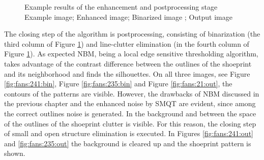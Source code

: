 \documentclass[draft,final]{vutinfth} %
\begin{document}
{\begin{figure}[H]

\caption{Example results of the enhancement and postprocessing stage
				 Example image;  Enhanced image;  Binarized image ;  Output image}
\label{fig:fans:enhance}

\end{figure}
}
\par
The closing step of the algorithm is postprocessing, consisting of binarization (the third column of Figure \ref{fig:fans:enhance}) and line-clutter elimination (in the fourth column of Figure \ref{fig:fans:enhance}).
As expected NBM, being a local edge sensitive thresholding algorithm, takes advantage of the contrast difference between the outlines of the shoeprint  and its neighborhood and finds the silhouettes. 
On all three images, see Figure \ref{fig:fans:241:bin}, Figure \ref{fig:fans:235:bin} and Figure \ref{fig:fans:21:out}, the contours of the patterns are visible.
However, the drawbacks of NBM discussed in the previous chapter and the enhanced noise by SMQT are evident, since among the correct outlines noise is generated.
In the background and between the space of the outlines of the shoeprint clutter is visible.
For this reason, the closing step of small and open structure elimination is executed.
In Figures \ref{fig:fans:241:out} and \ref{fig:fans:235:out} the background is cleared up and the shoeprint pattern is shown.
\end{document}
